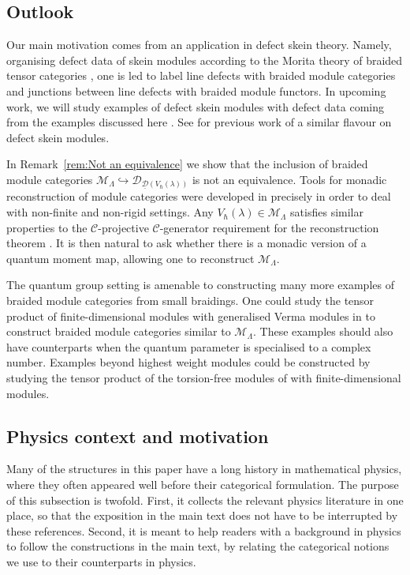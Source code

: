 \documentclass[12pt,dvipsnames]{article}
\numberwithin{equation}{section}
\theoremstyle{definition}
\newcommand{\cat}[1]{\mathcal{#1}}
\newcommand{\1}{\ensuremath{\mathbbm{1}}}
\begin{document}
\subsection{Outlook}\label{sec:outlook}

Our main motivation comes from an application in defect skein theory. Namely, organising defect data of skein modules according to the Morita theory of braided tensor categories \cite{BJS18}, one is led to label line defects with braided module categories and junctions between line defects with braided module functors. 
In upcoming work, we will study examples of defect skein modules with defect data coming from the examples discussed here \cite{paper2-skeins}.
See \cite{BBJ16,BJ25,G26,KR26,BGJV26,CJR26} for previous work of a similar flavour on defect skein modules.

In Remark~\ref{rem:Not an equivalence} we show that the inclusion of braided module categories $\cat{M}_\Lambda\hookrightarrow\cat{D}_{\underline{\cat{D}}(V_\hbar(\lambda))}$ is not an equivalence. Tools for monadic reconstruction of module categories were developed in \cite{SZ24} precisely in order to deal with non-finite and non-rigid settings. Any $V_\hbar(\lambda)\in\cat{M}_\Lambda$ satisfies similar properties to the $\cat{C}$-projective $\cat{C}$-generator requirement for the reconstruction theorem \cite[Thm.\,5.1]{SZ24}. It is then natural to ask whether there is a monadic version of a quantum moment map, allowing one to reconstruct $\cat{M}_\Lambda$.

The quantum group setting is amenable to constructing many more examples of braided module categories from small braidings. One could study the tensor product of finite-dimensional modules with generalised Verma modules in \cite[Prop.\,3.7]{Mu04} to construct braided module categories similar to $\cat{M}_\Lambda$. These examples should also have counterparts when the quantum parameter is specialised to a complex number. Examples beyond highest weight modules could be constructed by studying the tensor product of the torsion-free modules of \cite{FHW14} with finite-dimensional modules.


\subsection{Physics context and motivation}\label{subsec:physics}
 
Many of the structures in this paper have a long history in mathematical physics, where they often appeared well before their categorical formulation.
The purpose of this subsection is twofold. First, it collects the relevant physics literature in one place, so that the exposition in the main text does not have to be interrupted by these references. Second, it is meant to help readers with a background in physics to follow the constructions in the main text, by relating the categorical notions we use to their counterparts in
physics.
 
\end{document}
